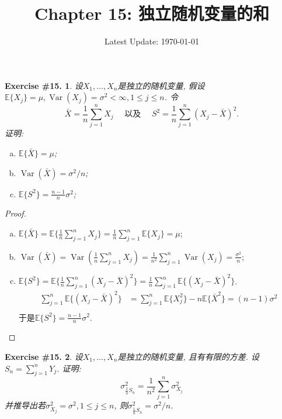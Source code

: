 \documentclass[UTF8, a4paper]{article}
\title{Chapter 15: 独立随机变量的和}
\author{}
\date{Latest Update: \today}
\newtheorem{exercise}{Exercise \#15.}
\begin{document}
\maketitle

\begin{framed}
\begin{exercise}
设\(X_1, ..., X_n\)是独立的随机变量, 假设\(\mathbb{E}\{X_j\} = \mu, \operatorname{Var}(X_j) = \sigma^2 < \infty, 1 \leq j\leq n\).
令
$$
\bar{X}=\frac{1}{n} \sum_{j=1}^n X_j \quad \text { 以及 } \quad S^2=\frac{1}{n} \sum_{j=1}^n\left(X_j-\bar{X}\right)^2 .
$$
证明:
\begin{enumerate}[a)]
    \item \(\mathbb{E}\{\bar{X}\} = \mu\);
    \item \(\operatorname{Var}(\bar{X}) = \sigma^2/n\);
    \item \(\mathbb{E}\{S^2\} =\frac{n-1}{n} \sigma^2\);
\end{enumerate}
\end{exercise}
\end{framed}

\begin{proof}
\begin{enumerate}[a)]
    \item \(\mathbb{E}\{\bar{X}\} = \mathbb{E}\{\frac{1}{n} \sum_{j=1}^n X_j\} = \frac{1}{n} \sum_{j=1}^n \mathbb{E}\{X_j\} = \mu\);
    \item \(\operatorname{Var}(\bar{X}) = \operatorname{Var}(\frac{1}{n} \sum_{j=1}^n X_j) = \frac{1}{n^2} \sum_{j=1}^n \operatorname{Var}(X_j) = \frac{\sigma^2}{n}\);
    \item \(\mathbb{E}\{S^2\} = \mathbb{E}\{\frac{1}{n} \sum_{j=1}^n\left(X_j-\bar{X}\right)^2\} = \frac{1}{n} \sum_{j=1}^n \mathbb{E}\{(X_j-\bar{X})^2\}\).
    \begin{align*}
        \sum_{j=1}^n\mathbb{E}\{(X_j-\bar{X})^2\} &= \sum_{j=1}^n \mathbb{E}\{X_j^2\} - n\mathbb{E}\{\bar{X}^2\} = (n-1)\sigma^2  \\
    \end{align*}
    于是\(\mathbb{E}\{S^2\} = \frac{n-1}{n}\sigma^2\).
\end{enumerate}
\end{proof}




\begin{framed}
\begin{exercise}
设\(X_1, ..., X_n\)是独立的随机变量, 且有有限的方差.
设\(S_n = \sum_{j=1}^{n}Y_j\). 证明:
$$
\sigma_{\frac{1}{n} S_n}^2=\frac{1}{n^2} \sum_{j=1}^n \sigma_{X_j}^2
$$
并推导出若\(\sigma_{X_j}^2 = \sigma^2, 1 \leq j \leq n\), 则\(\sigma_{\frac{1}{n} S_n}^2 = \sigma^2/n\).
\end{exercise}
\end{framed}
\end{document}

